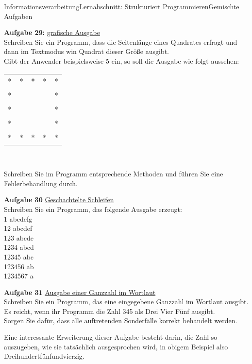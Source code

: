 \documentclass[oneside,openany,headings=optiontotoc,11pt,numbers=noenddot]{scrreprt}
\begin{document}
	\begin{worksheet}{Informationsverarbeitung}{Lernabschnitt: Strukturiert Programmieren}{Gemischte Aufgaben}
		\noindent
		\sffamily
		\begin{framed}
			\noindent
			\textbf{Aufgabe 29:} \underline{\grqq{}grafische Ausgabe\grqq{}}\\
			Schreiben Sie ein Programm, dass die Seitenlänge eines Quadrates erfragt und dann im Textmodus win Quadrat dieser Größe ausgibt.\\
			Gibt der Anwender beispielsweise 5 ein, so soll die Ausgabe wie folgt aussehen:\\
			\begin{tabular}{ccccc}
				* & * & * & * & *\\
				* & & & & *\\
				* & & & & *\\
				* & & & & *\\
				* & * & * & * & *\\
			\end{tabular}\\
			\par\noindent
			Schreiben Sie im Programm entsprechende Methoden und führen Sie eine Fehlerbehandlung durch.\\
			\par\noindent
			\textbf{Aufgabe 30} \underline{Geschachtelte Schleifen}\\
			Schreiben Sie ein Programm, das folgende Ausgabe erzeugt:\\
			1 abcdefg\\
			12 abcdef\\
			123 abcde\\
			1234 abcd\\
			12345 abc\\
			123456 ab\\
			1234567 a\\
			\par\noindent
			\textbf{Aufgabe 31} \underline{Ausgabe einer Ganzzahl im Wortlaut}\\
			Schreiben Sie ein Programm, das eine eingegebene Ganzzahl im Wortlaut ausgibt.\\
			Es reicht, wenn ihr Programm die Zahl 345 als \grqq{}Drei Vier Fünf\grqq{} ausgibt.\\
			Sorgen Sie dafür, dass alle auftretenden Sonderfälle korrekt behandelt werden.\\
			\par\noindent
			Eine interessante Erweiterung dieser Aufgabe besteht darin, die Zahl so auszugeben, wie sie tatsächlich ausgesprochen wird, in obigem Beispiel also \grqq{}Dreihundertfünfundvierzig\grqq{}.\\

\end{framed}
\end{worksheet}
\end{document}
